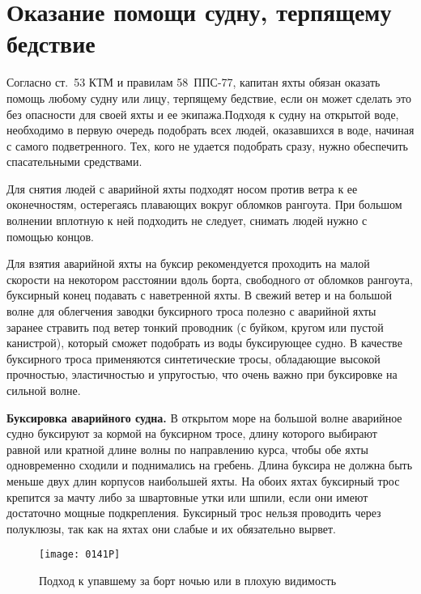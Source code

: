 \section{Оказание помощи судну, терпящему бедствие}

Согласно ст.~53 КТМ и правилам 58~ППС-77, капитан яхты обязан оказать помощь любому судну или лицу, терпящему бедствие, если он может сделать это без опасности для своей яхты и ее экипажа.Подходя к судну на открытой воде, необходимо в первую очередь подобрать всех людей, оказавшихся в воде, начиная с самого подветренного. Тех, кого не удается подобрать сразу, нужно обеспечить спасательными средствами.

Для снятия людей с аварийной яхты подходят носом против ветра к ее оконечностям, остерегаясь плавающих вокруг обломков рангоута. При большом волнении вплотную к ней подходить не следует, снимать людей нужно с помощью концов.

Для взятия аварийной яхты на буксир рекомендуется проходить на малой скорости на некотором расстоянии вдоль борта, свободного от обломков рангоута, буксирный конец подавать с наветренной яхты. В свежий ветер и на большой волне для облегчения заводки буксирного троса полезно с аварийной яхты заранее стравить под ветер тонкий проводник (с буйком, кругом или пустой канистрой), который сможет подобрать из воды буксирующее судно. В качестве буксирного троса применяются синтетические тросы, обладающие высокой прочностью, эластичностью и упругостью, что очень важно при буксировке на сильной волне. 

\textbf{Буксировка аварийного судна.} В открытом море на большой волне аварийное судно буксируют за кормой на буксирном тросе, длину которого выбирают равной или кратной длине волны по направлению курса, чтобы обе яхты одновременно сходили и поднимались на гребень. Длина буксира не должна быть меньше двух длин корпусов наибольшей яхты. На обоих яхтах буксирный трос крепится за мачту либо за швартовные утки или шпили, если они имеют достаточно мощные подкрепления. Буксирный трос нельзя проводить через полуклюзы, так как на яхтах они слабые и их обязательно вырвет. 

\begin{figure}[htb]
  \centering{}
  \texttt{[image: 0141P]}
  \caption{Подход к упавшему за борт ночью или в плохую видимость}
  \label{fig:141}
\end{figure}


